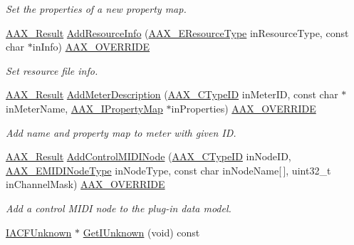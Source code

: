 \begin{DoxyCompactItemize}
\begin{DoxyCompactList}\small\item\em Set the properties of a new property map. \end{DoxyCompactList}\item 
\mbox{\hyperlink{a00392_a4d8f69a697df7f70c3a8e9b8ee130d2f}{A\+A\+X\+\_\+\+Result}} \mbox{\hyperlink{a01913_add421d47c7812ffab6ef2210acc458c6}{Add\+Resource\+Info}} (\mbox{\hyperlink{a00491_ae2805e88175d975589153a04e42898bb}{A\+A\+X\+\_\+\+E\+Resource\+Type}} in\+Resource\+Type, const char $\ast$in\+Info) \mbox{\hyperlink{a00392_ac2f24a5172689ae684344abdcce55463}{A\+A\+X\+\_\+\+O\+V\+E\+R\+R\+I\+DE}}
\begin{DoxyCompactList}\small\item\em Set resource file info. \end{DoxyCompactList}\item 
\mbox{\hyperlink{a00392_a4d8f69a697df7f70c3a8e9b8ee130d2f}{A\+A\+X\+\_\+\+Result}} \mbox{\hyperlink{a01913_a496f09c1bff6b03672d13c42214d1d16}{Add\+Meter\+Description}} (\mbox{\hyperlink{a00392_ac678f9c1fbcc26315d209f71a147a175}{A\+A\+X\+\_\+\+C\+Type\+ID}} in\+Meter\+ID, const char $\ast$in\+Meter\+Name, \mbox{\hyperlink{a01869}{A\+A\+X\+\_\+\+I\+Property\+Map}} $\ast$in\+Properties) \mbox{\hyperlink{a00392_ac2f24a5172689ae684344abdcce55463}{A\+A\+X\+\_\+\+O\+V\+E\+R\+R\+I\+DE}}
\begin{DoxyCompactList}\small\item\em Add name and property map to meter with given ID. \end{DoxyCompactList}\item 
\mbox{\hyperlink{a00392_a4d8f69a697df7f70c3a8e9b8ee130d2f}{A\+A\+X\+\_\+\+Result}} \mbox{\hyperlink{a01913_a4fcd7f20eb9fb8f7387a744a34ed83a5}{Add\+Control\+M\+I\+D\+I\+Node}} (\mbox{\hyperlink{a00392_ac678f9c1fbcc26315d209f71a147a175}{A\+A\+X\+\_\+\+C\+Type\+ID}} in\+Node\+ID, \mbox{\hyperlink{a00491_a5e1dffce35d05990dbbad651702678e4}{A\+A\+X\+\_\+\+E\+M\+I\+D\+I\+Node\+Type}} in\+Node\+Type, const char in\+Node\+Name\mbox{[}$\,$\mbox{]}, uint32\+\_\+t in\+Channel\+Mask) \mbox{\hyperlink{a00392_ac2f24a5172689ae684344abdcce55463}{A\+A\+X\+\_\+\+O\+V\+E\+R\+R\+I\+DE}}
\begin{DoxyCompactList}\small\item\em Add a control M\+I\+DI node to the plug-\/in data model. \end{DoxyCompactList}\item 
\mbox{\hyperlink{a01409}{I\+A\+C\+F\+Unknown}} $\ast$ \mbox{\hyperlink{a01913_a7f968960469f22f5cbb702bad52f6d7e}{Get\+I\+Unknown}} (void) const
\end{DoxyCompactItemize}


